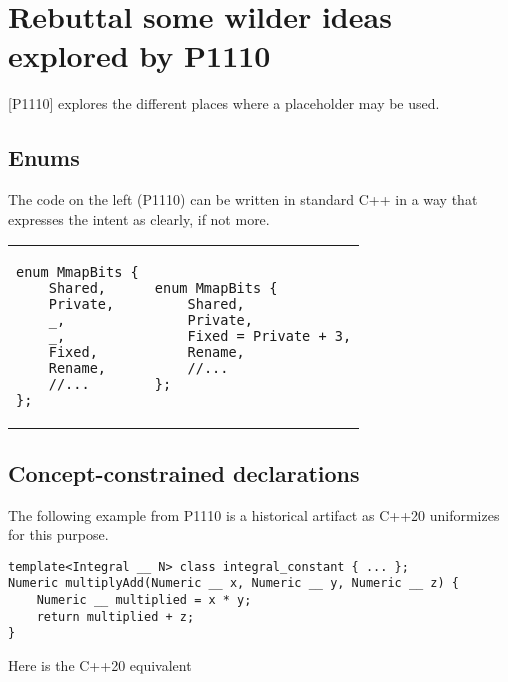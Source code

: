 \documentclass{wg21}
\begin{document}
{\section{Rebuttal some wilder ideas explored by P1110}

[P1110] explores the different places where a placeholder may be used.


\subsection{Enums}

The code on the left (P1110) can be written in standard C++ in a way that expresses the intent as clearly, if not more.

\begin{center}
\begin{tabular}{l|l}
\begin{minipage}[t]{0.5\textwidth}
\begin{lstlisting}[style=color]
enum MmapBits {
    Shared,
    Private,
    _,
    _,
    Fixed,
    Rename,
    //...
};

\end{lstlisting}
\end{minipage}
&
\begin{minipage}[t]{0.5\textwidth}
\begin{lstlisting}[style=color]
enum MmapBits {
    Shared,
    Private,
    Fixed = Private + 3,
    Rename,
    //...
};

\end{lstlisting}
\end{minipage}
\end{tabular}
\end{center}

\subsection{Concept-constrained declarations}

The following example from P1110 is a historical artifact as C++20 uniformizes  for this purpose.

\begin{lstlisting}[style=color]
template<Integral __ N> class integral_constant { ... };
Numeric multiplyAdd(Numeric __ x, Numeric __ y, Numeric __ z) {
    Numeric __ multiplied = x * y;
    return multiplied + z;
}
\end{lstlisting}

Here is the C++20 equivalent

}
\end{document}
